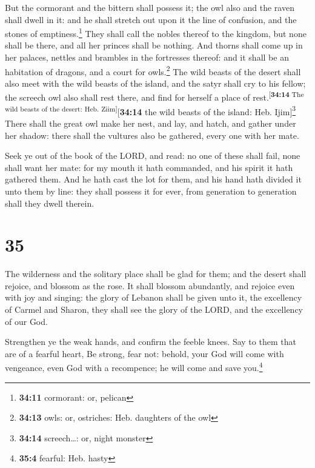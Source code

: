  But the cormorant and the bittern shall possess it; the
owl also and the raven shall dwell in it: and he shall stretch out upon
it the line of confusion, and the stones of emptiness.\footnote{\textbf{34:11}
  cormorant: or, pelican}  They shall call the nobles
thereof to the kingdom, but none shall be there, and all her princes
shall be nothing.  And thorns shall come up in her
palaces, nettles and brambles in the fortresses thereof: and it shall be
an habitation of dragons, and a court for owls.\footnote{\textbf{34:13}
  owls: or, ostriches: Heb. daughters of the owl}  The
wild beasts of the desert shall also meet with the wild beasts of the
island, and the satyr shall cry to his fellow; the screech owl also
shall rest there, and find for herself a place of
rest.\textsuperscript{{[}\textbf{34:14} The wild beasts of the desert:
Heb. Ziim{]}}{[}\textbf{34:14} the wild beasts of the island: Heb.
Ijim{]}\footnote{\textbf{34:14} screech\ldots: or, night monster}
 There shall the great owl make her nest, and lay, and
hatch, and gather under her shadow: there shall the vultures also be
gathered, every one with her mate.

 Seek ye out of the book of the LORD, and read: no one of
these shall fail, none shall want her mate: for my mouth it hath
commanded, and his spirit it hath gathered them.  And he
hath cast the lot for them, and his hand hath divided it unto them by
line: they shall possess it for ever, from generation to generation
shall they dwell therein.

\hypertarget{section-34}{%
\section{35}\label{section-34}}

 The wilderness and the solitary place shall be glad for
them; and the desert shall rejoice, and blossom as the rose.
 It shall blossom abundantly, and rejoice even with joy
and singing: the glory of Lebanon shall be given unto it, the excellency
of Carmel and Sharon, they shall see the glory of the LORD, and the
excellency of our God.

 Strengthen ye the weak hands, and confirm the feeble
knees.  Say to them that are of a fearful heart, Be
strong, fear not: behold, your God will come with vengeance, even God
with a recompence; he will come and save you.\footnote{\textbf{35:4}
  fearful: Heb. hasty}

